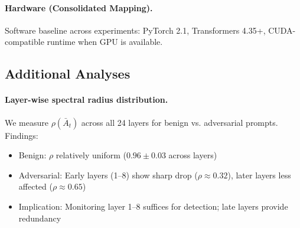 \documentclass[10pt,twocolumn]{article}
\begin{document}
\paragraph{Hardware (Consolidated Mapping).}
\begin{table}[t]
\centering
\caption{Appendix A.4: experiment-to-hardware mapping.}
\label{tab:hardware_map}
\vspace{2pt}
\begin{minipage}{\columnwidth}
{\footnotesize Software baseline across experiments: PyTorch 2.1, Transformers 4.35+, CUDA-compatible runtime when GPU is available.}
\end{minipage}
\end{table}

\vspace{-0.8em}
\subsection{Additional Analyses}
\label{sec:additional_analyses}

\vspace{-0.5em}
\paragraph{Layer-wise spectral radius distribution.}
We measure $\rho(\bar{A}_t)$ across all 24 layers for benign vs. adversarial prompts. Findings:
\begin{itemize}[nosep]
\item Benign: $\rho$ relatively uniform ($0.96 \pm 0.03$ across layers)
\item Adversarial: Early layers (1--8) show sharp drop ($\rho \approx 0.32$), later layers less affected ($\rho \approx 0.65$)
\item Implication: Monitoring layer 1--8 suffices for detection; late layers provide redundancy
\end{itemize}
\end{document}
